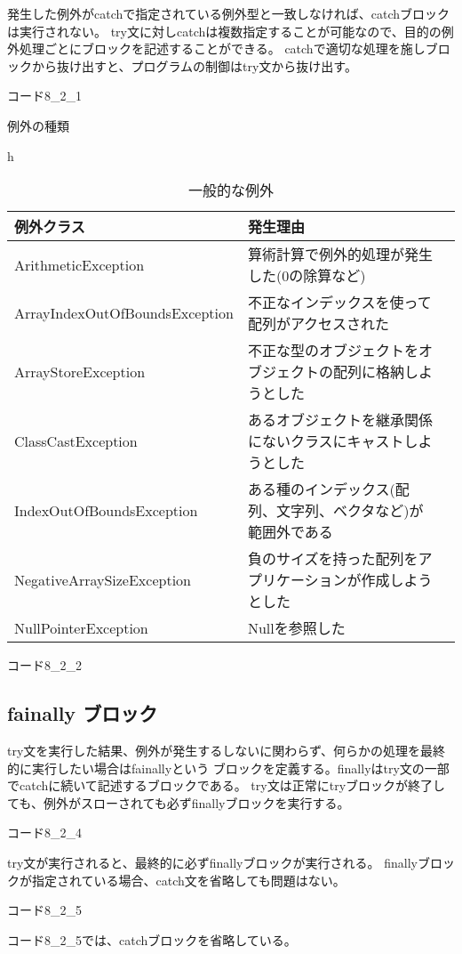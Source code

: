 \documentclass[12pt,a4j,twoside]{jsbook}
\begin{document}
発生した例外がcatchで指定されている例外型と一致しなければ、catchブロックは実行されない。
try文に対しcatchは複数指定することが可能なので、目的の例外処理ごとにブロックを記述することができる。
catchで適切な処理を施しブロックから抜け出すと、プログラムの制御はtry文から抜け出す。

コード8\_2\_1

例外の種類

\begin{table}{h}
    \caption{一般的な例外}
    \begin{tabular}{|l|l|l|} \hline
        例外クラス & 発生理由 \\ \hline
        ArithmeticException & 算術計算で例外的処理が発生した(0の除算など)　\\ \hline
        ArrayIndexOutOfBoundsException & 不正なインデックスを使って配列がアクセスされた　 \\ \hline
        ArrayStoreException & 不正な型のオブジェクトをオブジェクトの配列に格納しようとした \\ \hline
        ClassCastException & あるオブジェクトを継承関係にないクラスにキャストしようとした \\ \hline
        IndexOutOfBoundsException & ある種のインデックス(配列、文字列、ベクタなど)が範囲外である \\ \hline
        NegativeArraySizeException & 負のサイズを持った配列をアプリケーションが作成しようとした \\ \hline
        NullPointerException & Nullを参照した \\ \hline
    \end{tabular}
\end{table}

コード8\_2\_2

\subsection{fainally ブロック}
try文を実行した結果、例外が発生するしないに関わらず、何らかの処理を最終的に実行したい場合はfainallyという
ブロックを定義する。finallyはtry文の一部でcatchに続いて記述するブロックである。
try文は正常にtryブロックが終了しても、例外がスローされても必ずfinallyブロックを実行する。

コード8\_2\_4

try文が実行されると、最終的に必ずfinallyブロックが実行される。
finallyブロックが指定されている場合、catch文を省略しても問題はない。

コード8\_2\_5

コード8\_2\_5では、catchブロックを省略している。
\end{document}

